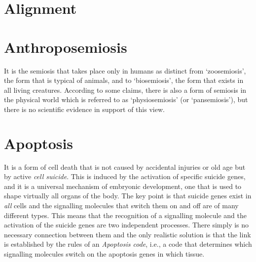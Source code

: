 \documentclass[12pt]{article}
\begin{document}
\hypertarget{alignment}{}
\section{Alignment}
 
\section{Anthroposemiosis }
It is the semiosis that takes place only in humans as distinct from `zoosemiosis', the form that is typical of animals, and to `biosemiosis', the form that exists in all living creatures. According to some claims, there is also a form of semiosis in the physical world which is referred to as `physiosemiosis' (or `pansemiosis'), but there is no scientific evidence in support of this view.


\hypertarget{apoptosis}{}
\section{Apoptosis}
It is a form of cell death that is not caused by accidental injuries or old age but by active \textit{cell suicide}. This is induced by the activation of specific suicide genes, and it is a universal mechanism of embryonic development, one that is used to shape virtually all organs of the body. The key point is that suicide genes exist in \textit{all} cells and the signalling molecules that switch them on and off are of many different types. This means that the recognition of a signalling molecule and the activation of the suicide genes are two independent processes. There simply is no necessary connection between them and the only realistic solution is that the link is established by the rules of an \textit{Apoptosis code}, i.e., a code that determines which signalling molecules switch on the apoptosis genes in which tissue.
\end{document}
